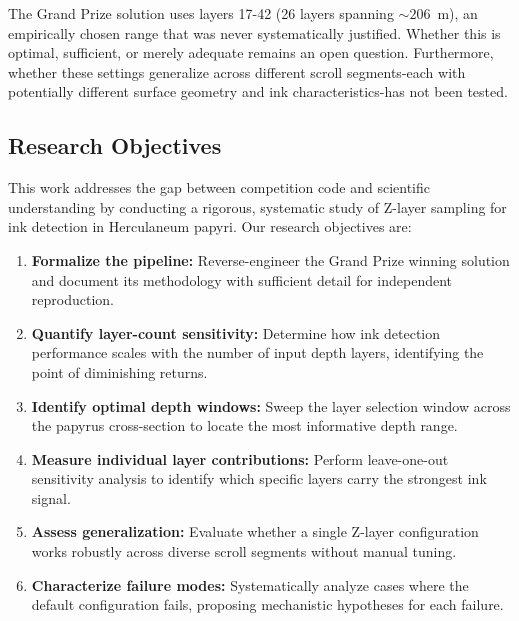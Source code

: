 The Grand Prize solution uses layers 17-42 (26 layers spanning ${\sim}206$~\textmu m), an empirically chosen range that was never systematically justified. Whether this is optimal, sufficient, or merely adequate remains an open question. Furthermore, whether these settings generalize across different scroll segments-each with potentially different surface geometry and ink characteristics-has not been tested.

\subsection{Research Objectives}

This work addresses the gap between competition code and scientific understanding by conducting a rigorous, systematic study of Z-layer sampling for ink detection in Herculaneum papyri. Our research objectives are:

\begin{enumerate}
    \item \textbf{Formalize the pipeline:} Reverse-engineer the Grand Prize winning solution and document its methodology with sufficient detail for independent reproduction.
    
    \item \textbf{Quantify layer-count sensitivity:} Determine how ink detection performance scales with the number of input depth layers, identifying the point of diminishing returns.
    
    \item \textbf{Identify optimal depth windows:} Sweep the layer selection window across the papyrus cross-section to locate the most informative depth range.
    
    \item \textbf{Measure individual layer contributions:} Perform leave-one-out sensitivity analysis to identify which specific layers carry the strongest ink signal.
    
    \item \textbf{Assess generalization:} Evaluate whether a single Z-layer configuration works robustly across diverse scroll segments without manual tuning.
    
    \item \textbf{Characterize failure modes:} Systematically analyze cases where the default configuration fails, proposing mechanistic hypotheses for each failure.
\end{enumerate}


